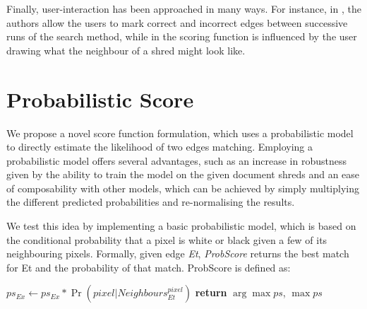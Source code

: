 \documentclass{llncs}
\begin{document}
Finally, user-interaction has been approached in many ways. For instance, in \cite{P10,P5}, the authors allow the users to mark correct and incorrect edges between successive runs of the search method, while in \cite{P14} the scoring function is influenced by the user drawing what the neighbour of a shred might look like.

\section{Probabilistic Score}
We propose a novel score function formulation, which uses a probabilistic model to directly estimate the likelihood of two edges matching. Employing a probabilistic model offers several advantages, such as an increase in robustness given by the ability to train the model on the given document shreds and an ease of composability with other models, which can be achieved by simply multiplying the different predicted probabilities and re-normalising the results.

We test this idea by implementing a basic probabilistic model, which is based on the conditional probability that a pixel is white or black given a few of its neighbouring pixels. Formally, given edge \emph{Et}, \emph{ProbScore} returns the best match for Et and the probability of that match. ProbScore is defined as:
\begin{algorithmic}
   
      \State $ps_{Ex} \gets ps_{Ex} * \Pr(pixel|Neighbours_{Et}^{pixel})$ 
    \EndFor
  \EndFor
   
  \State \textbf{return} $\arg\max ps$, $\max ps$
\EndProcedure
\end{algorithmic}
\end{document}
